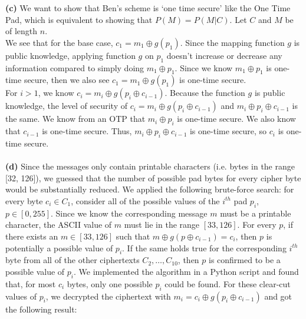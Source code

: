 \documentclass[11pt]{article}
\begin{document}
\textbf{(c)} We want to show that Ben's scheme is `one time secure' like the One Time Pad, which is equivalent to showing that $P(M) = P(M|C)$. Let $C$ and $M$ be of length $n$. 
\\ We see that for the base case, $c_1 = m_1 \oplus g(p_1)$. Since the mapping function $g$ is public knowledge, applying function $g$ on $p_1$ doesn't increase or decrease any information compared to simply doing $m_1 \oplus p_1$. Since we know $m_1 \oplus p_1$ is one-time secure, then we also see $c_1 = m_1 \oplus g(p_1)$ is one-time secure.
\\ For $i > 1$, we know $c_i = m_i \oplus g(p_i \oplus c_{i-1})$. Because the function $g$ is public knowledge, the level of security of $c_i = m_i \oplus g(p_i \oplus c_{i-1})$ and $m_i \oplus p_i \oplus c_{i-1}$ is the same. We know from an OTP that $m_i \oplus p_i$ is one-time secure. We also know that $c_{i-1}$ is one-time secure. Thus, $m_i \oplus p_i \oplus c_{i-1}$ is one-time secure, so $c_i$ is one-time secure.
\\
\\ \textbf{(d)}
Since the messages only contain printable characters (i.e. bytes in the range [32, 126]), we guessed that the number of possible pad bytes for every cipher byte would be substantially reduced. We applied the following brute-force search: for every byte $c_i \in C_1$, consider all of the possible values of the $i^{th}$ pad $p_i$, $p \in [0, 255]$. Since we know the corresponding message $m$ must be a printable character, the ASCII value of $m$ must lie in the range $[33,126]$. For every $p$, if there exists an $m \in [33, 126]$ such that $m \oplus g(p \oplus c_{i - 1}) = c_i$, then $p$ is potentially a possible value of $p_i$. If the same holds true for the corresponding $i^{th}$ byte from all of the other ciphertexts $C_2, \ldots, C_{10}$, then $p$ is confirmed to be a possible value of $p_i$. We implemented the algorithm in a Python script and found that, for most $c_i$ bytes, only one possible $p_i$ could be found. For these clear-cut values of $p_i$, we decrypted the ciphertext with $m_i = c_i \oplus g(p_i \oplus c_{i - 1})$ and got the following result:
\end{document}
